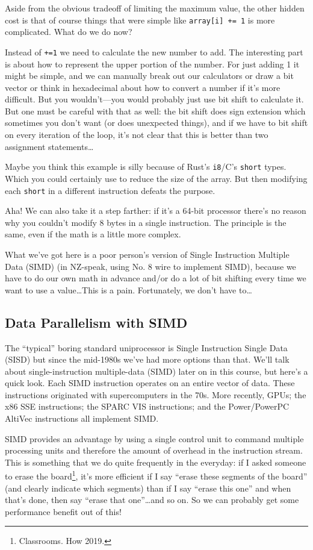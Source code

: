 \documentclass[a4paper]{report}
\begin{document}
Aside from the obvious tradeoff of limiting the maximum value, the other hidden cost is that of course things that were simple like \texttt{array[i] += 1} is more complicated. What do we do now?

Instead of \texttt{+=1} we need to calculate the new number to add. The interesting part is about how to represent the upper portion of the number. For just adding 1 it might be simple, and we can manually break out our calculators or draw a bit vector or think in hexadecimal about how to convert a number if it's more difficult. But you wouldn't---you would probably just use bit shift to calculate it. But one must be careful with that as well: the bit shift does sign extension which sometimes you don't want (or does unexpected things), and if we have to bit shift on every iteration of the loop, it's not clear that this is better than two assignment statements\ldots

Maybe you think this example is silly because of Rust's \texttt{i8}/C's \texttt{short} types. Which you could certainly use to reduce the size of the array. But then modifying each \texttt{short} in a different instruction defeats the purpose.

Aha! We can also take it a step farther: if it's a 64-bit processor there's no reason why you couldn't modify 8 bytes in a single instruction. The principle is the same, even if the math is a little more complex.

What we've got here is a poor person's version of Single Instruction Multiple Data (SIMD) (in NZ-speak, using No. 8 wire to implement SIMD), because we have to do our own math in advance and/or do a lot of bit shifting every time we want to use a value\ldots This is a pain. Fortunately, we don't have to\ldots

\subsection*{Data Parallelism with SIMD}
The ``typical'' boring standard uniprocessor is Single Instruction Single Data (SISD) but since the mid-1980s we've had more options than that. We'll talk about single-instruction multiple-data (SIMD) later on in
this course, but here's a quick look. Each SIMD
instruction operates on an entire vector of data. These instructions
originated with supercomputers in the 70s. More recently, GPUs; the
x86 SSE instructions; the SPARC VIS instructions; and the
Power/PowerPC AltiVec instructions all implement SIMD.

SIMD provides an advantage by using a single control unit to command multiple processing units and therefore the amount of overhead in the instruction stream. This is something that we do quite frequently in the everyday: if I asked someone to erase the board\footnote{Classrooms. How 2019.}, it's more efficient if I say ``erase these segments of the board'' (and clearly indicate which segments) than if I say ``erase this one'' and when that's done, then say ``erase that one''\ldots and so on. So we can probably get some performance benefit out of this!
\end{document}
